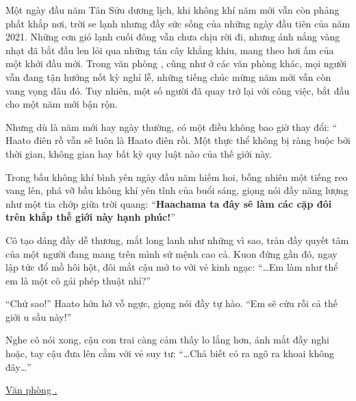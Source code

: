 \documentclass[../main.tex]{subfiles}
\begin{document}

Một ngày đầu năm Tân Sửu dương lịch, khi không khí năm mới vẫn còn phảng phất khắp nơi, trời se lạnh nhưng đầy sức sống của những ngày đầu tiên của năm 2021. Những cơn gió lạnh cuối đông vẫn chưa chịu rời đi, nhưng ánh nắng vàng nhạt đã bắt đầu len lỏi qua những tán cây khẳng khiu, mang theo hơi ấm của một khởi đầu mới. Trong văn phòng \hll, cũng như ở các văn phòng khác, mọi người vẫn đang tận hưởng nốt kỳ nghỉ lễ, những tiếng chúc mừng năm mới vẫn còn vang vọng đâu đó. Tuy nhiên, một số người đã quay trở lại với công việc, bắt đầu cho một năm mới bận rộn.

Nhưng dù là năm mới hay ngày thường, có một điều không bao giờ thay đổi: `` Haato điên rồ vẫn sẽ luôn là Haato điên rồi. Một thực thể không bị ràng buộc bởi thời gian, không gian hay bất kỳ quy luật nào của thế giới này.

Trong bầu không khí bình yên ngày đầu năm hiếm hoi, bỗng nhiên một tiếng reo vang lên, phá vỡ bầu không khí yên tĩnh của buổi sáng, giọng nói đầy năng lượng như một tia chớp giữa trời quang: ``\textbf{Haachama ta đây sẽ làm các cặp đôi trên khắp thế giới này hạnh phúc!}''


Cô tạo dáng đầy dễ thương, mắt long lanh như những vì sao, tràn đầy quyết tâm của một người đang mang trên mình sứ mệnh cao cả. Kuon đứng gần đó, ngay lập tức đổ mồ hôi hột, đôi mắt cậu mở to với vẻ kinh ngạc: ``\dots Em làm như thể em là một cô gái phép thuật nhỉ?''

``Chứ sao!'' Haato hớn hở vỗ ngực, giọng nói đầy tự hào. ``Em sẽ cứu rỗi cả thế giới u sầu này!''

Nghe cô nói xong, cậu con trai càng cảm thấy lo lắng hơn, ánh mắt đầy nghi hoặc, tay cậu đưa lên cằm với vẻ suy tư: ``\dots Chả biết có ra ngô ra khoai không đây\dots''

\begin{center}
  \uline{Văn phòng \hll.}
\end{center}
\end{document}
